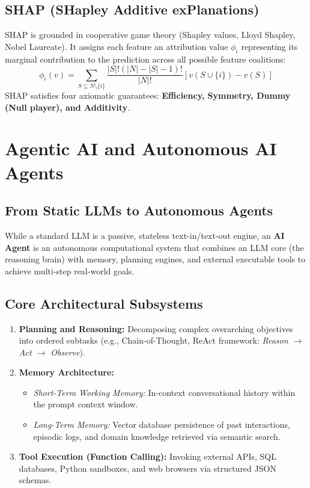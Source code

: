 \subsection{SHAP (SHapley Additive exPlanations)}
SHAP is grounded in cooperative game theory (Shapley values, Lloyd Shapley, Nobel Laureate). It assigns each feature an attribution value $\phi_i$ representing its marginal contribution to the prediction across all possible feature coalitions:
\begin{equation}
\label{eq:shapley_formula}
\phi_i(v) = \sum_{S \subseteq N \setminus \{i\}} \frac{|S|! (|N| - |S| - 1)!}{|N|!} \left[ v(S \cup \{i\}) - v(S) \right]
\end{equation}
SHAP satisfies four axiomatic guarantees: \textbf{Efficiency, Symmetry, Dummy (Null player), and Additivity}.


\section{Agentic AI and Autonomous AI Agents}
\label{sec:agentic_ai}

\subsection{From Static LLMs to Autonomous Agents}
While a standard LLM is a passive, stateless text-in/text-out engine, an \textbf{AI Agent} is an autonomous computational system that combines an LLM core (the reasoning brain) with memory, planning engines, and external executable tools to achieve multi-step real-world goals.

\subsection{Core Architectural Subsystems}
\begin{enumerate}
    \item \textbf{Planning and Reasoning:} Decomposing complex overarching objectives into ordered subtasks (e.g., Chain-of-Thought, ReAct framework: \textit{Reason $\to$ Act $\to$ Observe}).
    \item \textbf{Memory Architecture:}
    \begin{itemize}
        \item \textit{Short-Term Working Memory:} In-context conversational history within the prompt context window.
        \item \textit{Long-Term Memory:} Vector database persistence of past interactions, episodic logs, and domain knowledge retrieved via semantic search.
    \end{itemize}
    \item \textbf{Tool Execution (Function Calling):} Invoking external APIs, SQL databases, Python sandboxes, and web browsers via structured JSON schemas.
\end{enumerate}


